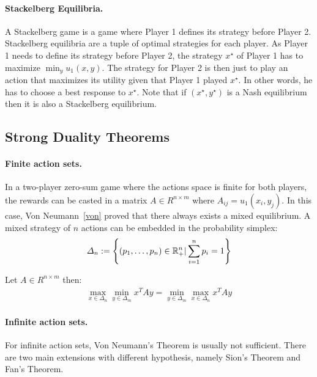 \paragraph{Stackelberg Equilibria.} A Stackelberg game is a game where Player 1 defines its strategy before Player 2. Stackelberg equilibria are a tuple of optimal strategies for each player. As Player 1 needs to define its strategy before Player 2, the strategy $x^\star$ of Player 1 has to maximize $\min_y u_1(x,y)$. The strategy for Player 2 is then just to play an action that maximizes its utility given that Player 1 played $x^\star$. In other words, he has to choose a best response to $x^\star$. Note that if $(x^\star,y^\star)$ is a Nash equilibrium then it is also a Stackelberg equilibrium.



\subsection{Strong Duality Theorems}

\paragraph{Finite action sets.} In a two-player zero-sum game where the actions space is finite for both players, the rewards can be casted in a matrix $A\in R^{n\times m}$ where $A_{ij} =u_1(x_i,y_j)$. In this case, Von Neumann~\ref{von} proved that there always exists a mixed equilibrium. A mixed strategy of $n$ actions can be embedded in the probability simplex:
\begin{align*}
    \Delta_n := \left\{(p_1,\dots,p_n)\in\RR_+^n| \sum_{i=1}^n p_i = 1  \right\}
\end{align*}

\begin{thm}
    Let $A\in R^{n\times m}$ then:
    \begin{align*}
        \max_{x\in \Delta_n}\min_{y\in \Delta_m} x^TAy = \min_{y\in \Delta_m}\max_{x\in \Delta_n} x^TAy
    \end{align*}
\end{thm}

\paragraph{Infinite action sets.} For infinite action sets, Von Neumann's Theorem is usually not sufficient. There are two main extensions with different hypothesis, namely Sion's Theorem and Fan's Theorem.

